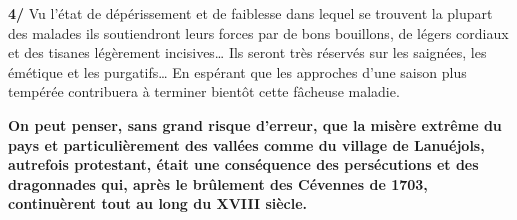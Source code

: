 {\quad \textbf{4/} Vu l’état de dépérissement et de faiblesse dans lequel se trouvent la plupart des malades ils soutiendront leurs forces par de bons bouillons, de légers cordiaux et des tisanes légèrement incisives… Ils seront très réservés sur les saignées, les émétique et les purgatifs… En espérant que les approches d’une saison plus tempérée contribuera à terminer bientôt cette fâcheuse maladie.

\vfill

\begin{tcolorbox}[
  colback=white,
  colframe=black,
  boxrule=0.7pt,
  arc=0pt,
  left=6pt,right=6pt,top=5pt,bottom=5pt
]
\textbf{On peut penser, sans grand risque d’erreur, que la misère extrême du pays et particulièrement des vallées comme du village de Lanuéjols, autrefois protestant, était une conséquence des persécutions et des dragonnades qui, après le brûlement des Cévennes de 1703, continuèrent tout au long du XVIII\ieme{} siècle.}
\end{tcolorbox}

}
\vspace{8mm}


